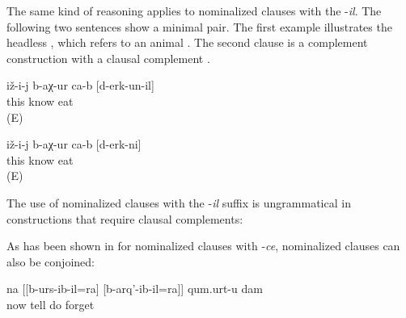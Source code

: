 The same kind of reasoning applies to nominalized clauses with the  -\textit{il}. The following two sentences show a minimal pair. The first example illustrates the headless , which refers to an animal . The second clause is a complement construction with a clausal complement . 
%
\begin{exe}
	\ex	\label{ex:He learned that they ate them}
	\begin{xlist}
			\ex	\label{ex:He got to know who ate (them)@B}
		\gll	iž-i-j	b-aχ-ur	ca-b	[d-erk-un-il]\\
			this	know		eat\\
		\glt	{} (E)
		
		\ex	\label{ex:He got to know that (they) ate (them)@A}
		\gll	iž-i-j	b-aχ-ur	ca-b	[d-erk-ni]\\
			this	know		eat\\
		\glt	{} (E)
	\end{xlist}
\end{exe}

The use of nominalized clauses with the -\textit{il} suffix is ungrammatical in constructions that require clausal complements:

\begin{exe}

\end{exe}

As has been shown in  for nominalized clauses with -\textit{ce}, nominalized clauses can also be conjoined:

%
\begin{exe}
	\ex	\label{ex:‎I forget what I say and what I do}
	\gll	na	[[b-urs-ib-il=ra]	[b-arq'-ib-il=ra]]	qum.urt-u	dam\\
		now	tell	do	forget	\\
	\glt	{}
\end{exe}



